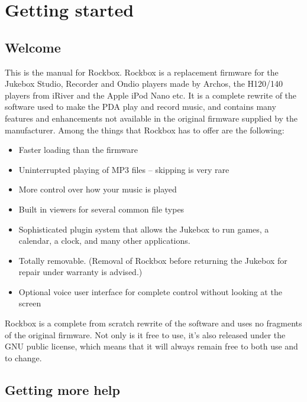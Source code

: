 \chapter{Getting started}
\section{Welcome}
This is the manual for Rockbox.  Rockbox is a replacement firmware for the
Jukebox Studio, Recorder and Ondio players made by Archos, the H120/140
players from iRiver and the Apple iPod Nano etc.  It is a complete rewrite of
the software used to make the PDA play and record music, and contains many
features and enhancements not available in the original firmware supplied by
the manufacturer.  Among the things that Rockbox has to offer are the
following:

\begin{itemize}
\item Faster loading than the \playername firmware
\item Uninterrupted playing of MP3 files {--} skipping is very rare
\item More control over how your music is played
\item Built in viewers for several common file types
\item Sophisticated plugin system that allows the Jukebox to run games,
a calendar, a clock, and many other applications.
\item Totally removable. (Removal of Rockbox before returning the
Jukebox for repair under warranty is advised.)
\item Optional voice user interface for complete control without looking
at the screen
\end{itemize}
Rockbox is a complete from scratch rewrite of the \playername software and
uses no fragments of the original firmware.  Not only is it free to
use, it's also released under the GNU public license,
which means that it will always remain free to both use and to change.


\section{Getting more help}

